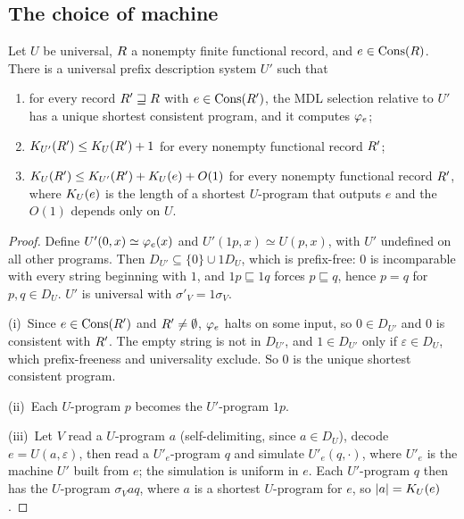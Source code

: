 \subsection{The choice of machine}

\begin{theorem}\label{thm:con-machine}
Let $U$ be universal, $R$ a nonempty finite functional record, and
$e\in\operatorname{Cons}(R)$. There is a universal prefix description system $U'$ such that
\begin{enumerate}[label=(\roman*)]
  \item for every record $R'\sqsupseteq R$ with $e\in\operatorname{Cons}(R')$, the
        MDL selection relative to $U'$ has a unique shortest consistent program,
        and it computes $\varphi_{e}$;
  \item $K_{U'}(R')\le K_{U}(R')+1$ for every nonempty functional record
        $R'$;
  \item $K_{U}(R')\le K_{U'}(R')+K_{U}(e)+O(1)$ for every nonempty functional
        record $R'$, where $K_{U}(e)$ is the length of a shortest $U$-program that
        outputs $e$ and the $O(1)$ depends only on $U$.
\end{enumerate}
\end{theorem}

\begin{proof}
Define $U'(0,x)\simeq\varphi_{e}(x)$ and $U'(1p,x)\simeq U(p,x)$, with $U'$ undefined on
all other programs. Then $D_{U'}\subseteq\{0\}\cup 1D_U$, which is prefix-free: $0$ is
incomparable with every string beginning with $1$, and $1p\sqsubseteq 1q$ forces
$p\sqsubseteq q$, hence $p=q$ for $p,q\in D_U$. $U'$ is universal with
$\sigma'_V=1\sigma_V$.

(i)~Since $e\in\operatorname{Cons}(R')$ and $R'\neq\emptyset$, $\varphi_{e}$ halts on some input,
so $0\in D_{U'}$ and $0$ is consistent with $R'$. The empty string is not in
$D_{U'}$, and $1\in D_{U'}$ only if $\varepsilon\in D_U$, which prefix-freeness and
universality exclude. So $0$ is the unique shortest consistent program.

(ii)~Each $U$-program $p$ becomes the $U'$-program $1p$.

(iii)~Let $V$ read a $U$-program $a$ (self-delimiting, since $a\in D_U$), decode
$e=U(a,\varepsilon)$, then read a $U'_e$-program $q$ and simulate $U'_e(q,\cdot)$, where
$U'_e$ is the machine $U'$ built from $e$; the simulation is uniform in $e$. Each
$U'$-program $q$ then has the $U$-program $\sigma_V a q$, where $a$ is a shortest
$U$-program for $e$, so $|a|=K_{U}(e)$.
\end{proof}

